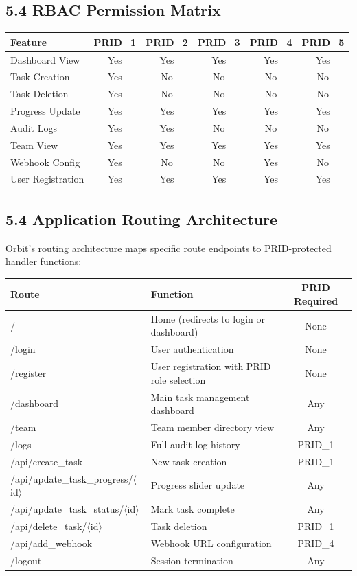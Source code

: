 ﻿\documentclass[12pt]{article}
\begin{document}
\subsection*{5.4 RBAC Permission Matrix}
\begin{center}
\begin{tabular}{|l|c|c|c|c|c|}
\hline
\textbf{Feature} & \textbf{PRID\_1} & \textbf{PRID\_2} & \textbf{PRID\_3} & \textbf{PRID\_4} & \textbf{PRID\_5} \\ \hline
Dashboard View & Yes & Yes & Yes & Yes & Yes \\ \hline
Task Creation & Yes & No & No & No & No \\ \hline
Task Deletion & Yes & No & No & No & No \\ \hline
Progress Update & Yes & Yes & Yes & Yes & Yes \\ \hline
Audit Logs & Yes & Yes & No & No & No \\ \hline
Team View & Yes & Yes & Yes & Yes & Yes \\ \hline
Webhook Config & Yes & No & No & Yes & No \\ \hline
User Registration & Yes & Yes & Yes & Yes & Yes \\ \hline
\end{tabular}
\end{center}

\subsection*{5.4 Application Routing Architecture}
Orbit's routing architecture maps specific route endpoints to PRID-protected handler functions:

\begin{center}
\begin{tabular}{|l|l|c|}
\hline
\textbf{Route} & \textbf{Function} & \textbf{PRID Required} \\ \hline
/ & Home (redirects to login or dashboard) & None \\ \hline
/login & User authentication & None \\ \hline
/register & User registration with PRID role selection & None \\ \hline
/dashboard & Main task management dashboard & Any \\ \hline
/team & Team member directory view & Any \\ \hline
/logs & Full audit log history & PRID\_1 \\ \hline
/api/create\_task & New task creation & PRID\_1 \\ \hline
/api/update\_task\_progress/$\langle$id$\rangle$ & Progress slider update & Any \\ \hline
/api/update\_task\_status/$\langle$id$\rangle$ & Mark task complete & Any \\ \hline
/api/delete\_task/$\langle$id$\rangle$ & Task deletion & PRID\_1 \\ \hline
/api/add\_webhook & Webhook URL configuration & PRID\_4 \\ \hline
/logout & Session termination & Any \\ \hline
\end{tabular}
\end{center}
\end{document}
